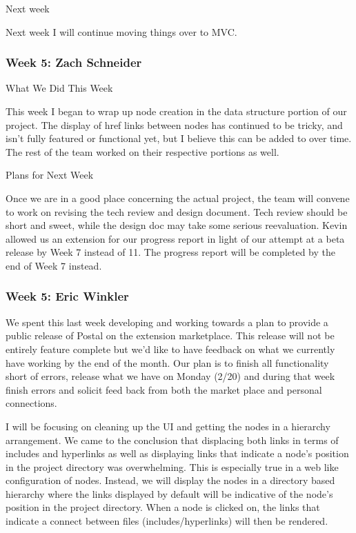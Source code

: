 Next week

Next week I will continue moving things over to MVC.  \\ 

 \subsubsection{Week 5: Zach Schneider}

What We Did This Week

This week I began to wrap up node creation in the data structure portion of our project. The display of href links between nodes has continued to be tricky, and isn't fully featured or functional yet, but I believe this can be added to over time. The rest of the team worked on their respective portions as well.



Plans for Next Week

Once we are in a good place concerning the actual project, the team will convene to work on revising the tech review and design document. Tech review should be short and sweet, while the design doc may take some serious reevaluation. Kevin allowed us an extension for our progress report in light of our attempt at a beta release by Week 7 instead of 11. The progress report will be completed by the end of Week 7 instead. \\ 

 \subsubsection{Week 5: Eric Winkler}

We spent this last week developing and working towards a plan to provide a public release of Postal on the extension marketplace. This release will not be entirely feature complete but we'd like to have feedback on what we currently have working by the end of the month. Our plan is to finish all functionality short of errors, release what we have on Monday (2/20) and during that week finish errors and solicit feed back from both the market place and personal connections. 



I will be focusing on cleaning up the UI and getting the nodes in a hierarchy arrangement. We came to the conclusion that displacing both links in terms of includes and hyperlinks as well as displaying links that indicate a node's position in the project directory was overwhelming. This is especially true in a web like configuration of nodes. Instead, we will display the nodes in a directory based hierarchy where the links displayed by default will be indicative of the node's position in the project directory. When a node is clicked on, the links that indicate a connect between files (includes/hyperlinks) will then be rendered. \\ 


